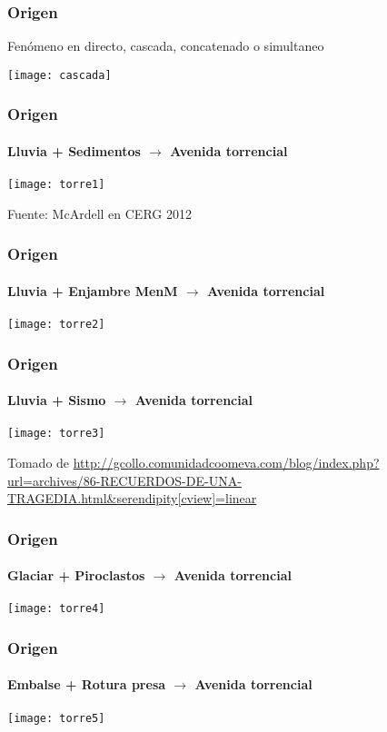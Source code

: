 \documentclass{beamer}
\begin{document}
\begin{frame}
\frametitle{Origen}
\small{Fenómeno en directo, cascada, concatenado o simultaneo}
\begin{center}
   	\texttt{[image: cascada]}
\end{center}
\end{frame}
\begin{frame}
\frametitle{Origen}
\framesubtitle{Lluvia + Sedimentos $\rightarrow$ Avenida torrencial}
\begin{center}
   	\texttt{[image: torre1]}
\end{center}
\tiny{Fuente: McArdell en CERG 2012}
\end{frame}
\begin{frame}
\frametitle{Origen}
\framesubtitle{Lluvia + Enjambre MenM $\rightarrow$ Avenida torrencial}
\begin{center}
   	\texttt{[image: torre2]}
\end{center}
\end{frame}
\begin{frame}
\frametitle{Origen}
\framesubtitle{Lluvia + Sismo $\rightarrow$ Avenida torrencial}
\begin{center}
   	\texttt{[image: torre3]}
\end{center}
\tiny{Tomado de \url{http://gcollo.comunidadcoomeva.com/blog/index.php?url=archives/86-RECUERDOS-DE-UNA-TRAGEDIA.html&serendipity[cview]=linear}}
\end{frame}
\begin{frame}
\frametitle{Origen}
\framesubtitle{Glaciar + Piroclastos $\rightarrow$ Avenida torrencial}
\begin{center}
   	\texttt{[image: torre4]}
\end{center}
\end{frame}
\begin{frame}
\frametitle{Origen}
\framesubtitle{Embalse + Rotura presa $\rightarrow$ Avenida torrencial}
\begin{center}
   	\texttt{[image: torre5]}
\end{center}
\end{frame}
\end{document}
